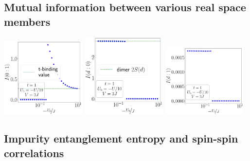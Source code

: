 \documentclass[10pt]{report}
\numberwithin{equation}{section}
\begin{document}
\subsection*{Mutual information between various real space members}
\begin{center}
	\includegraphics[width=0.32\textwidth]{../figures/mi-01-t=1.000,J=10.000,0.000,30,V=3J,Ubath=-U_by_10,N=6,U=1.000,889.513,30.pdf}
	\includegraphics[width=0.32\textwidth]{../figures/mi-d0-t=1.000,J=10.000,0.000,30,V=3J,Ubath=-U_by_10,N=6,U=1.000,889.513,30.pdf}
	\includegraphics[width=0.32\textwidth]{../figures/mi-d1-t=1.000,J=10.000,0.000,30,V=3J,Ubath=-U_by_10,N=6,U=1.000,889.513,30.pdf}
\end{center}

\subsection*{Impurity entanglement entropy and spin-spin correlations}
\end{document}
